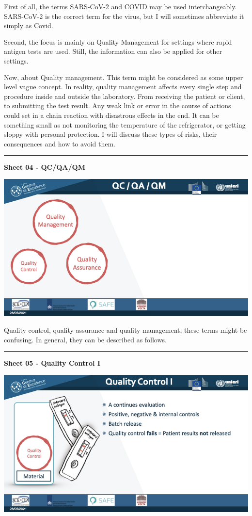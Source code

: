 \documentclass[
]{book}
\begin{document}
First of all, the terms SARS-CoV-2 and COVID may be used
interchangeably. SARS-CoV-2 is the correct term for the virus, but I
will sometimes abbreviate it simply as Covid.

Second, the focus is mainly on Quality Management for settings where
rapid antigen tests are used. Still, the information can also be applied
for other settings.

Now, about Quality management. This term might be considered as some
upper level vague concept. In reality, quality management affects every
single step and procedure inside and outside the laboratory. From
receiving the patient or client, to submitting the test result. Any weak
link or error in the course of actions could set in a chain reaction
with disastrous effects in the end. It can be something small as not
monitoring the temperature of the refrigerator, or getting sloppy with
personal protection. I will discuss these types of risks, their
consequences and how to avoid them.

\begin{center}\rule{0.5\linewidth}{0.5pt}\end{center}

\textbf{Sheet 04 - QC/QA/QM}

\includegraphics{images/m04/m04_Quality_management_v3.004.jpeg}

Quality control, quality assurance and quality management, these terms
might be confusing. In general, they can be described as follows.

\begin{center}\rule{0.5\linewidth}{0.5pt}\end{center}

\textbf{Sheet 05 - Quality Control I}

\includegraphics{images/m04/m04_Quality_management_v3.005.jpeg}
\end{document}
